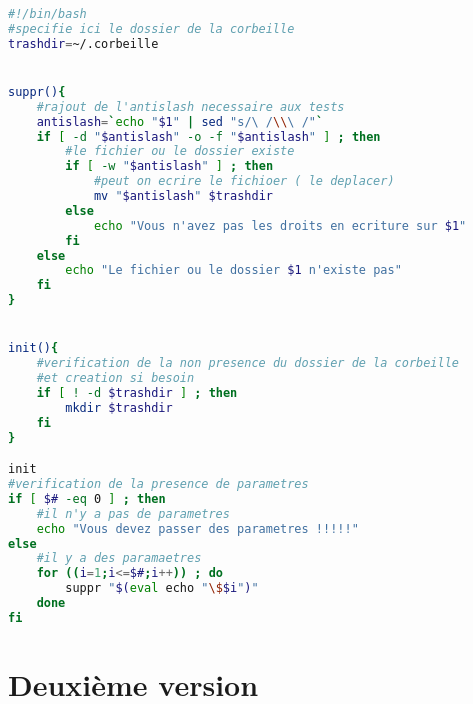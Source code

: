 \documentclass[12pt, a4paper]{article}
\begin{document}
\begin{lstlisting}[frame=single, language=bash]
#!/bin/bash
#specifie ici le dossier de la corbeille
trashdir=~/.corbeille


suppr(){
	#rajout de l'antislash necessaire aux tests
	antislash=`echo "$1" | sed "s/\ /\\\ /"`
	if [ -d "$antislash" -o -f "$antislash" ] ; then
		#le fichier ou le dossier existe
		if [ -w "$antislash" ] ; then
			#peut on ecrire le fichioer ( le deplacer)
			mv "$antislash" $trashdir
		else
			echo "Vous n'avez pas les droits en ecriture sur $1"
		fi
	else
		echo "Le fichier ou le dossier $1 n'existe pas"
	fi
}


init(){
	#verification de la non presence du dossier de la corbeille
	#et creation si besoin
	if [ ! -d $trashdir ] ; then
		mkdir $trashdir 
	fi
}

init
#verification de la presence de parametres
if [ $# -eq 0 ] ; then
	#il n'y a pas de parametres
	echo "Vous devez passer des parametres !!!!!"
else
	#il y a des paramaetres
	for ((i=1;i<=$#;i++)) ; do
		suppr "$(eval echo "\$$i")"
	done
fi
\end{lstlisting}

\section{Deuxième version}
\end{document}
